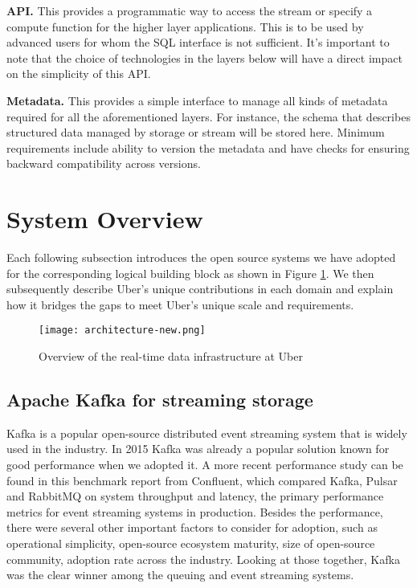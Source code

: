 \documentclass[sigconf]{acmart}
\begin{document}
{\bfseries API.} This provides a programmatic way to access the stream or specify a compute function for the higher layer applications. This is to be used by advanced users for whom the SQL interface is not sufficient. It’s important to note that the choice of technologies in the layers below will have a direct impact on the simplicity of this API. 

{\bfseries Metadata.} This provides a simple interface to manage all kinds of metadata required for all the aforementioned layers. For instance, the schema that describes structured data managed by storage or stream will be stored here. Minimum requirements include ability to version the metadata and have checks for ensuring backward compatibility across versions.

\section{System Overview} \label{sec:overview}

Each following subsection introduces the open source systems we have adopted for the corresponding logical building block as shown in Figure \ref{fig:overview}. We then subsequently describe Uber’s unique contributions in each domain and explain how it bridges the gaps to meet Uber’s unique scale and requirements.

\begin{figure}[h]
  \centering
  \texttt{[image: architecture-new.png]}
  \caption{Overview of the real-time data infrastructure at Uber}
  \label{fig:overview}
\end{figure}

\subsection{Apache Kafka for streaming storage} \label{sec:kafka}

Kafka\cite{kreps2011kafka} is a popular open-source distributed event streaming system that is widely used in the industry. In 2015 Kafka was already a popular solution known for good performance when we adopted it. A more recent performance study can be found in this benchmark report from Confluent\cite{confluent-test}, which compared Kafka, Pulsar\cite{pulsar} and RabbitMQ\cite{rabbitmq} on system throughput and latency, the primary performance metrics for event streaming systems in production. Besides the performance, there were several other important factors to consider for adoption, such as operational simplicity, open-source ecosystem maturity, size of open-source community, adoption rate across the industry. Looking at those together, Kafka was the clear winner among the queuing and event streaming systems. 
\end{document}
